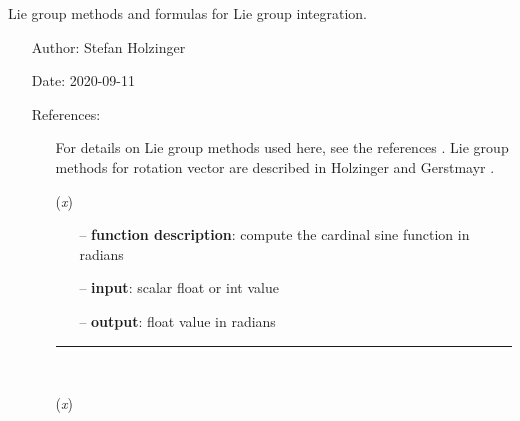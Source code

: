 \begin{itemize}[leftmargin=1.4cm]
\begin{itemize}[leftmargin=0.5cm]
\begin{itemize}[leftmargin=1.4cm]
\begin{itemize}[leftmargin=0.5cm]
\begin{itemize}[leftmargin=1.4cm]
\begin{itemize}[leftmargin=0.5cm]
\begin{itemize}[leftmargin=1.4cm]
\begin{itemize}[leftmargin=1.4cm]
\begin{itemize}[leftmargin=1.4cm]
\begin{itemize}[leftmargin=0.7cm]
\begin{itemize}[leftmargin=1.2cm]
  \end{itemize}
\vspace{12pt}\end{itemize}
%
\label{sec:module:lieGroupBasics}
  Lie group methods and formulas for Lie group integration.
\begin{itemize}[leftmargin=1.4cm]
\setlength{\itemindent}{-1.4cm}
\item[]Author:    Stefan Holzinger
\item[]Date:      2020-09-11
\item[]References:
\vspace{-22pt}\begin{itemize}[leftmargin=0.5cm]
\setlength{\itemindent}{-0.5cm}
\item[]   
\item[]               For details on Lie group methods used here, see the references \cite{Henderson1977, Simo1988, Bruels2011, Sonneville2014, Sonneville2017, Terze2016, Mueller2017}.               Lie group methods for rotation vector are described in Holzinger and Gerstmayr \cite{HolzingerGerstmayr2020, Holzinger2021}.               
\ei
\ei
\begin{flushleft}
\label{sec:lieGroupBasics:Sinc}
({\it x})
\end{flushleft}
\setlength{\itemindent}{0.7cm}
\begin{itemize}[leftmargin=0.7cm]
  \item[--]  {\bf function description}: compute the cardinal sine function in radians  \item[--]  {\bf input}: scalar float or int value  \item[--]  {\bf output}: float value in radians\vspace{12pt}\end{itemize}
%
\noindent\rule{8cm}{0.75pt}\vspace{1pt} \\ 
\begin{flushleft}
\label{sec:lieGroupBasics:Cot}
({\it x})
\end{flushleft}
\setlength{\itemindent}{0.7cm}
\begin{itemize}[leftmargin=0.7cm]

\end{itemize}
\end{itemize}
\end{itemize}
\end{itemize}
\end{itemize}
\end{itemize}
\end{itemize}
\end{itemize}
\end{itemize}
\end{itemize}
\end{itemize}
\end{itemize}
